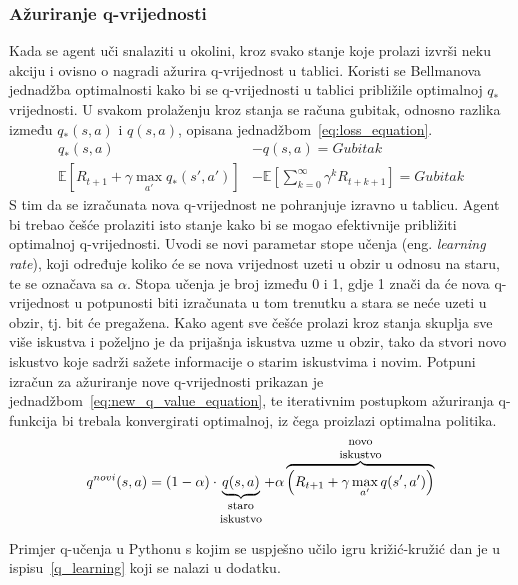 \subsubsection{Ažuriranje q-vrijednosti}
Kada se agent uči snalaziti u okolini, kroz svako stanje koje prolazi izvrši neku akciju i ovisno o nagradi ažurira q-vrijednost u tablici. Koristi se Bellmanova jednadžba optimalnosti kako bi se q-vrijednosti u tablici približile optimalnoj $q_*$ vrijednosti. U svakom prolaženju kroz stanja se računa gubitak, odnosno razlika između $q_*(s,a)$ i $q(s, a)$, opisana jednadžbom~\ref{eq:loss_equation}. 
\begin{equation}\label{eq:loss_equation}
\begin{split}
q_*(s, a) &- q(s, a) = Gubitak \\
\mathbb{E}\left[R_{t+1} + \gamma\max_{a'}q_*(s', a')\right] &- 
\mathbb{E}\left[\sum_{k=0}^{\infty}\gamma^kR_{t+k+1}\right] = Gubitak
\end{split}
\end{equation}
S tim da se izračunata nova q-vrijednost ne pohranjuje izravno u tablicu. Agent bi trebao češće prolaziti isto stanje kako bi se mogao efektivnije približiti optimalnoj q-vrijednosti. Uvodi se novi parametar stope učenja (eng. \textit{learning rate}), koji određuje koliko će se nova vrijednost uzeti u obzir u odnosu na staru, te se označava sa  $\alpha$. Stopa učenja je broj između 0 i 1, gdje 1 znači da će nova q-vrijednost u potpunosti biti izračunata u tom trenutku a stara se neće uzeti u obzir, tj. bit će pregažena. Kako agent sve češće prolazi kroz stanja skuplja sve više iskustva i poželjno je da prijašnja iskustva uzme u obzir, tako da stvori novo iskustvo koje sadrži sažete informacije o starim iskustvima i novim. Potpuni izračun za ažuriranje nove q-vrijednosti prikazan je jednadžbom~\ref{eq:new_q_value_equation}, te iterativnim postupkom ažuriranja q-funkcija bi trebala konvergirati optimalnoj, iz čega proizlazi optimalna politika.
\begin{equation}\label{eq:new_q_value_equation}
q^{novi}(s, a) = (1 - \alpha) \cdot \underbrace{q(s, a)}_{\parbox{3em}{\footnotesize\centering staro iskustvo}} + \alpha
\overbrace{\left(R_{t+1} + \gamma\max_{a'}q(s', a')\right)}^{\parbox{3em}{\footnotesize\centering novo iskustvo}}
\end{equation}

Primjer q-učenja u Pythonu s kojim se uspješno učilo igru križić-kružić dan je u ispisu~\ref{q_learning} koji se nalazi u dodatku.


